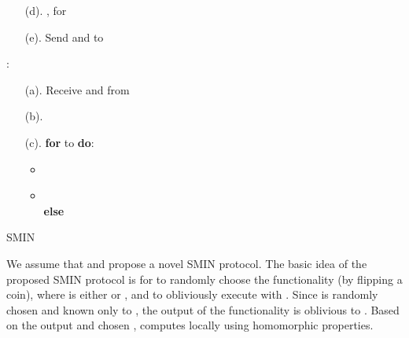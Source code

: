 \documentclass{article}
\begin{document}
\begin{algorithm}[!t]
\begin{algorithmic}[1]
\begin{enumerate}
       \item[(d).]  , for                     
       \item[(e).] Send  and  to 
\end{enumerate}
\STATE :
\begin{enumerate}\itemsep=0pt
        \item[(a).] Receive  and  from 
        \item[(b).]   
        \item[(c).] \textbf{for}  to  \textbf{do}:
                  \begin{itemize}\itemsep=0pt
                           \item 
                           \item  \\                           
                           \textbf{else}                                                       
                  \end{itemize}  
\end{enumerate}               
\end{algorithmic}
\caption{SMIN}
\label{alg:sm2n}
\end{algorithm}
We assume that  and propose a novel 
SMIN protocol. The basic idea of the proposed SMIN protocol is 
for  to randomly choose the functionality  (by flipping a coin), where 
 is either  or , and to obliviously execute  with 
. Since  is randomly chosen and known only to , the output of 
the functionality  is oblivious to . Based on the output and chosen , 
 computes  locally using homomorphic properties. 
\end{document}
